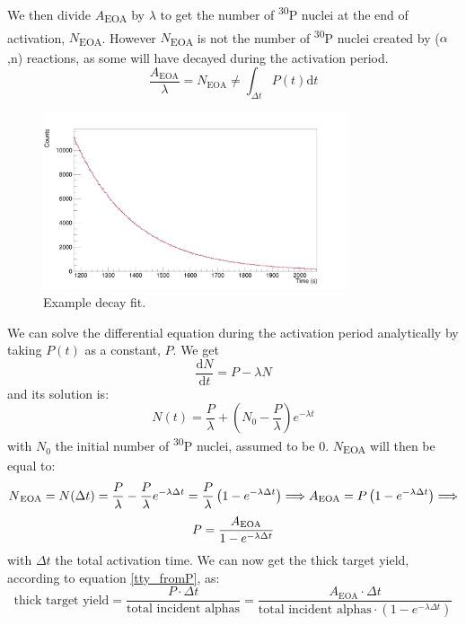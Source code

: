 \documentclass[a4paper,12pt]{report}
\newcommand{\dif}{\text{d}}
\newcommand{\ddt}[1]{\frac{\dif #1}{\dif t}}
\newcommand{\an}{($\alpha$,n) }
\newcommand{\Piso}{\textsuperscript{30}P }
\begin{document}
We then divide $A$\textsubscript{EOA} by $\lambda$ to get the number of \Piso nuclei at the end of activation, $N$\textsubscript{EOA}.
However $N$\textsubscript{EOA} is not the number of \Piso nuclei created by \an reactions, as some will have decayed during the activation period.
\[ \frac{A_\text{EOA}}{\lambda} = N_\text{EOA} \neq \int_{\Delta t}P(t) \dif t \]

\begin{figure}[H]
	\centering
	\includegraphics[width=0.80\textwidth]{example_decay_fit.png}
	\caption{Example decay fit.}
	\label{example_decay_fit}
\end{figure}

We can solve the differential equation during the activation period analytically by taking $P(t)$ as a constant, $P$.
We get
\[ \ddt{N} = P -\lambda N  \]
and its solution is:
\begin{equation}
	N(t) = \frac{P}{\lambda} + \left(  N_0 - \frac{P}{\lambda}  \right) e^{-\lambda t}
\end{equation}
with $N_0$ the initial number of \Piso nuclei, assumed to be \num{0}.
$N$\textsubscript{EOA} will then be equal to:
\[ N\textsubscript{EOA} =N(\Delta t) = \frac{P}{\lambda} - \frac{P}{\lambda} e^{-\lambda \Delta t} = \frac{P}{\lambda} \left(1 - e^{-\lambda \Delta t} \right)\Longrightarrow A\textsubscript{EOA}=P\left(1-e^{-\lambda\Delta t}\right)\Longrightarrow \]
\begin{equation}
	P = \frac{A\textsubscript{EOA}}{1 - e^{-\lambda \Delta t}}
\end{equation}
with $\Delta t$ the total activation time.
We can now get the thick target yield, according to equation \ref{tty_fromP}, as:
\begin{equation}
	\text{thick target yield} = \frac{P\cdot \Delta t}{\text{total incident alphas}} = \frac{A_\text{EOA}\cdot \Delta t}{\text{total incident alphas} \cdot \left( 1-e^{-\lambda \Delta t}  \right)}
\end{equation}
\end{document}
